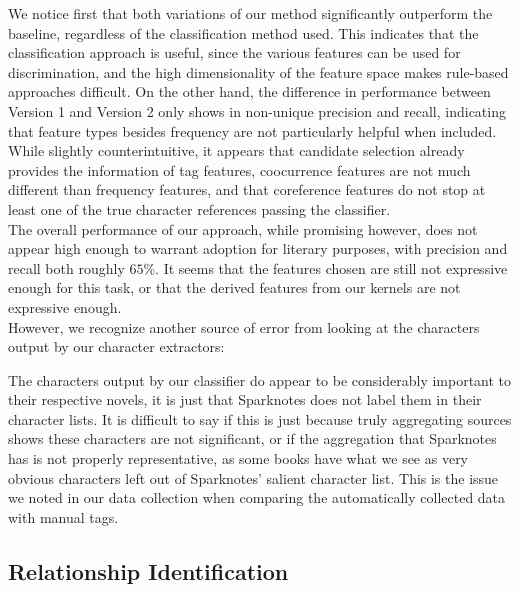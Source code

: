 \documentclass[12pt]{article}
\begin{document}

        We notice first that both variations of our method significantly outperform the baseline, regardless
        of the classification method used. This indicates that the classification approach is useful,
        since the various features can be used for discrimination, and the high dimensionality of the feature
        space makes rule-based approaches difficult. On the other hand, the difference in performance
        between Version 1 and Version 2 only shows in non-unique precision and recall, indicating that
        feature types besides frequency are not particularly helpful when included. While slightly
        counterintuitive, it appears that candidate selection already provides the information of tag
        features, coocurrence features are not much different than frequency features, and that coreference
        features do not stop at least one of the true character references passing the classifier. \\

        The overall performance of our approach, while promising however, does not appear high enough to warrant
        adoption for literary purposes, with precision and recall both roughly $65\%$. It seems 
        that the features chosen are still not expressive enough for this task, or that the derived features
        from our kernels are not expressive enough. \\

        However, we recognize another source of error from looking at the characters output by our
        character extractors:
    

        The characters output by our classifier do appear to be considerably important to their
        respective novels, it is just that Sparknotes does not label them in their character lists.
        It is difficult to say if this is just because truly aggregating sources shows these
        characters are not significant, or if the aggregation that Sparknotes has is not properly
        representative, as some books have what we see as very obvious characters left
        out of Sparknotes' salient character list. This is the issue we noted in our data
        collection when comparing the automatically collected data with manual tags. 

    \subsection{Relationship Identification}
\end{document}
